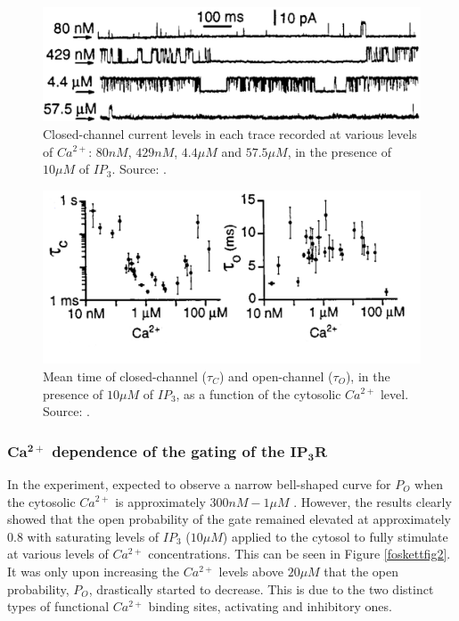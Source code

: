 \begin{figure}[h!!!t!!!b!!!p]
  \centering
  \includegraphics[width=1\linewidth]{Chapters/3_IP3R_dynamics/extras/fig1afoskett.PNG}
  \caption{Closed-channel current levels in each trace recorded at various levels of $Ca^{2+}$: $80 nM$, $429 nM$, $4.4 \mu M$ and $57.5 \mu M$, in the presence of $10 \mu M$ of $IP_3$. Source: . }\label{foskettfig1a}
\end{figure}
\begin{figure}[h!!!t!!!b!!!p]
  \centering
  \includegraphics[width=1\linewidth]{Chapters/3_IP3R_dynamics/extras/fig1bfoskett.PNG}
  \caption{Mean time of closed-channel ($\tau_C$) and open-channel ($\tau_O$), in the presence of $10 \mu M$ of $IP_3$, as a function of the cytosolic $Ca^{2+}$ level. Source: . }\label{foskettfig1b}
\end{figure}
\subsubsection*{${\mathbf{Ca^{2+}}}$ dependence of the gating of the $\mathbf{IP_3R}$}

In the experiment,  expected to observe a narrow bell-shaped curve for $P_O$ when the cytosolic $Ca^{2+}$ is approximately $300nM-1 \mu M$ . However, the results clearly showed that the open probability of the gate remained elevated at approximately $0.8$ with saturating levels of $IP_3$ ($10\mu M$) applied to the cytosol to fully stimulate at various levels of $Ca^{2+}$ concentrations. This can be seen in Figure \ref{foskettfig2}. It was only upon increasing the $Ca^{2+}$ levels above $20\mu M$ that the open probability, $P_O$, drastically started to decrease. This is due to the two distinct types of functional $Ca^{2+}$ binding sites, activating and inhibitory ones.

